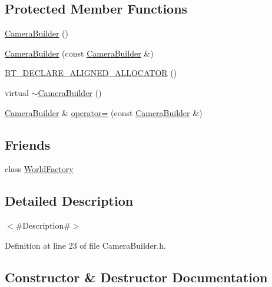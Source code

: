 \subsection*{Protected Member Functions}
\begin{DoxyCompactItemize}
\item 
\mbox{\hyperlink{classnjli_1_1_camera_builder_a76bd656e796c9b14fd60ab4762e46840}{Camera\+Builder}} ()
\item 
\mbox{\hyperlink{classnjli_1_1_camera_builder_af3533bf68a37790640ac81af6643fa28}{Camera\+Builder}} (const \mbox{\hyperlink{classnjli_1_1_camera_builder}{Camera\+Builder}} \&)
\item 
\mbox{\hyperlink{classnjli_1_1_camera_builder_af53e66a943c8f03efca83d55539e1335}{B\+T\+\_\+\+D\+E\+C\+L\+A\+R\+E\+\_\+\+A\+L\+I\+G\+N\+E\+D\+\_\+\+A\+L\+L\+O\+C\+A\+T\+OR}} ()
\item 
virtual \mbox{\hyperlink{classnjli_1_1_camera_builder_ad7710c2dee09df60a109939f67b4dd32}{$\sim$\+Camera\+Builder}} ()
\item 
\mbox{\hyperlink{classnjli_1_1_camera_builder}{Camera\+Builder}} \& \mbox{\hyperlink{classnjli_1_1_camera_builder_a25f79aa7c8c80fcd27c98d24c1af850c}{operator=}} (const \mbox{\hyperlink{classnjli_1_1_camera_builder}{Camera\+Builder}} \&)
\end{DoxyCompactItemize}
\subsection*{Friends}
\begin{DoxyCompactItemize}
\item 
class \mbox{\hyperlink{classnjli_1_1_camera_builder_acb96ebb09abe8f2a37a915a842babfac}{World\+Factory}}
\end{DoxyCompactItemize}


\subsection{Detailed Description}
$<$\#\+Description\#$>$ 

Definition at line 23 of file Camera\+Builder.\+h.



\subsection{Constructor \& Destructor Documentation}
\mbox{\label{classnjli_1_1_camera_builder_a76bd656e796c9b14fd60ab4762e46840}} 
